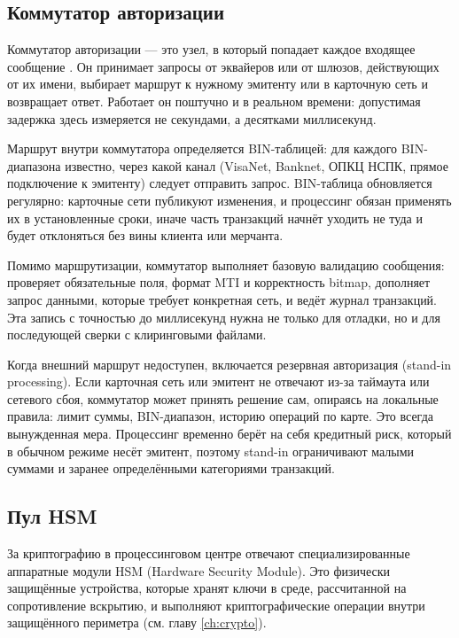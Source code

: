 \subsection*{Коммутатор авторизации}

Коммутатор авторизации — это узел, в который
попадает каждое входящее сообщение . Он принимает
запросы от эквайеров или от шлюзов, действующих от их имени,
выбирает маршрут к нужному эмитенту или в карточную сеть
и возвращает ответ. Работает он поштучно и в реальном времени:
допустимая задержка здесь измеряется не секундами,
а десятками миллисекунд.~\cite{visa-core-rules,mc-tpr}

Маршрут внутри коммутатора определяется BIN-таблицей:
для каждого BIN-диапазона известно, через какой канал
(VisaNet, Banknet, ОПКЦ НСПК, прямое подключение к эмитенту)
следует отправить запрос. BIN-таблица обновляется регулярно:
карточные сети публикуют изменения, и процессинг обязан
применять их в установленные сроки, иначе часть транзакций
начнёт уходить не туда и будет отклоняться без вины клиента
или мерчанта.~\cite{visa-core-rules,mc-rules}

Помимо маршрутизации, коммутатор выполняет базовую валидацию
сообщения: проверяет обязательные поля, формат MTI
и корректность bitmap, дополняет запрос данными, которые
требует конкретная сеть, и ведёт журнал транзакций.
Эта запись с точностью до миллисекунд нужна не только
для отладки, но и для последующей сверки с клиринговыми
файлами.

Когда внешний маршрут недоступен, включается резервная
авторизация (stand-in processing). Если карточная сеть
или эмитент не отвечают из-за таймаута или сетевого сбоя,
коммутатор может принять решение сам, опираясь на локальные
правила: лимит суммы, BIN-диапазон, историю операций по карте.
Это всегда вынужденная мера. Процессинг временно берёт
на себя кредитный риск, который в обычном режиме несёт
эмитент, поэтому stand-in ограничивают малыми суммами
и заранее определёнными категориями транзакций.~\cite{visa-core-rules,mc-rules}

\subsection*{Пул HSM}

За криптографию в процессинговом центре отвечают
специализированные аппаратные модули HSM
(Hardware Security Module). Это физически защищённые
устройства, которые хранят ключи в среде, рассчитанной
на сопротивление вскрытию, и выполняют криптографические
операции внутри защищённого периметра
(см. главу \ref{ch:crypto}).~\cite{pci-pts-hsm,pci-pin-security}

